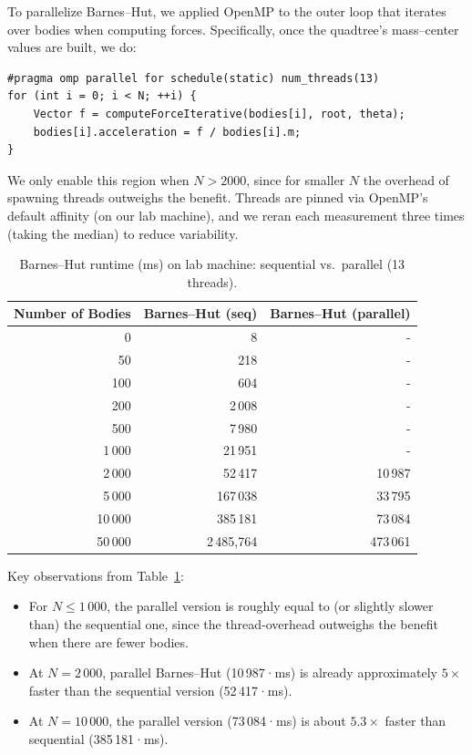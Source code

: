 \documentclass{article}
\begin{document}
\noindent
To parallelize Barnes–Hut, we applied OpenMP to the outer loop that iterates over bodies when computing forces. Specifically, once the quadtree’s mass–center values are built, we do:

\begin{verbatim}
#pragma omp parallel for schedule(static) num_threads(13)
for (int i = 0; i < N; ++i) {
    Vector f = computeForceIterative(bodies[i], root, theta);
    bodies[i].acceleration = f / bodies[i].m;
}
\end{verbatim}

We only enable this region when \(N > 2000\), since for smaller \(N\) the overhead of spawning threads outweighs the benefit. Threads are pinned via OpenMP’s default affinity (on our lab machine), and we reran each measurement three times (taking the median) to reduce variability.  


\begin{table}[H]
    \centering
    \begin{tabular}{|r|r|r|}
    \hline
    \textbf{Number of Bodies} & \textbf{Barnes–Hut (seq)} & \textbf{Barnes–Hut (parallel)} \\
    \hline
    0      &       8   &       -    \\ 
    50     &     218   &     -    \\ 
    100    &     604   &     -    \\ 
    200    &   2\,008  &   -   \\ 
    500    &   7\,980  &   -   \\ 
    1\,000 &  21\,951  &  -   \\ 
    2\,000 &  52\,417  &  10\,987   \\ 
    5\,000 & 167\,038  &  33\,795   \\ 
    10\,000& 385\,181  &  73\,084   \\ 
    50\,000& 2\,485,764  &  473\,061   \\ 
    \hline
    \end{tabular}
    \caption{Barnes–Hut runtime (ms) on lab machine: sequential vs.\ parallel (13 threads).}
    \label{tab:bh_seq_vs_par}
\end{table}

\noindent
Key observations from Table~\ref{tab:bh_seq_vs_par}:
\begin{itemize}
  \item For $N \le 1\,000$, the parallel version is roughly equal to (or slightly slower than) the sequential one, since the thread‐overhead outweighs the benefit when there are fewer bodies.
  \item At $N = 2\,000$, parallel Barnes–Hut (10\,987·ms) is already approximately $5\times$ faster than the sequential version (52\,417·ms).
  \item At $N = 10\,000$, the parallel version (73\,084·ms) is about $5.3\times$ faster than sequential (385\,181·ms).
\end{itemize}
\end{document}
